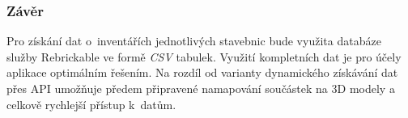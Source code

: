   \subsubsection*{Závěr}
  Pro získání dat o~inventářích jednotlivých stavebnic bude využita databáze služby Rebrickable ve formě \textit{\gls{CSV}} tabulek. Využití kompletních dat je pro účely aplikace optimálním řešením. Na rozdíl od varianty dynamického získávání dat přes \gls{API} umožňuje předem připravené namapování součástek na 3D modely a celkově rychlejší přístup k~datům.
